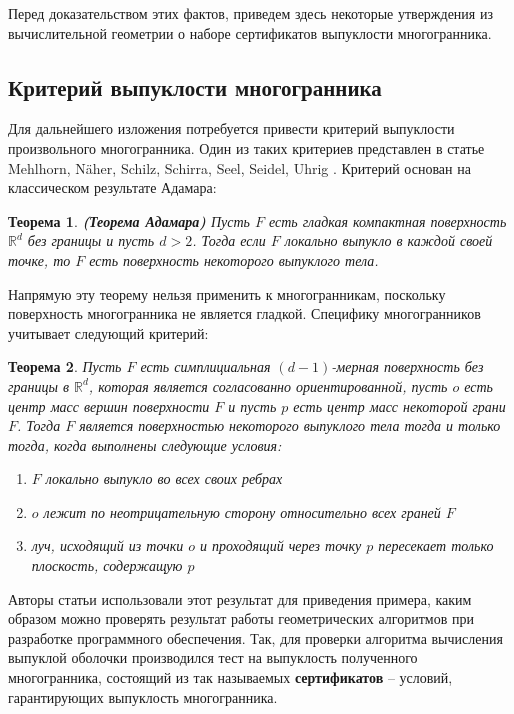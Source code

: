 \documentclass[a4paper, 12pt, titlepage]{article}
\theoremstyle{definition}
\theoremstyle{plain}
\newtheorem{SmartTheorem}{Теорема}
\theoremstyle{plain}
\begin{document}
Перед доказательством этих фактов, приведем здесь некоторые утверждения из
вычислительной геометрии о наборе сертификатов выпуклости многогранника.

\newpage
\subsection{Критерий выпуклости многогранника}
\label{sec:effictive-criterion:convexity-criterion}

Для дальнейшего изложения потребуется привести критерий выпуклости
произвольного многогранника. Один из таких критериев представлен в статье
Mehlhorn, Näher, Schilz, Schirra, Seel, Seidel, Uhrig
\cite{conf/compgeom/MehlhornNSSSSU96}. Критерий основан на классическом
результате Адамара:

\begin{SmartTheorem}
\textbf{(Теорема Адамара)} Пусть $\mathit{F}$ есть гладкая компактная
поверхность $\mathbb{R}^{d}$ без границы и пусть $d > 2$. Тогда если
$\mathit{F}$ локально выпукло  в каждой своей точке, то $\mathit{F}$ есть
поверхность некоторого выпуклого тела.
\end{SmartTheorem}

Напрямую эту теорему нельзя применить к многогранникам, поскольку поверхность
многогранника не является гладкой. Специфику многогранников учитывает
следующий критерий:

\begin{SmartTheorem}
Пусть $\mathit{F}$ есть симплициальная $(d - 1)$-мерная поверхность без
границы в $\mathbb{R}^{d}$, которая является согласованно ориентированной,
пусть $o$ есть центр масс вершин поверхности $\mathit{F}$ и пусть $p$ есть
центр масс некоторой грани $\mathit{F}$. Тогда $\mathit{F}$ является
поверхностью некоторого выпуклого тела тогда и только тогда, когда выполнены
следующие условия:
\begin{enumerate}
  \item $\mathit{F}$ локально выпукло во всех своих ребрах
  \item $o$ лежит по неотрицательную сторону относительно всех граней
  $\mathit{F}$
  \item луч, исходящий из точки $o$ и проходящий через точку $p$ пересекает
  только плоскость, содержащую $p$
\end{enumerate}
\end{SmartTheorem}

Авторы статьи \cite{conf/compgeom/MehlhornNSSSSU96} использовали этот
результат для приведения примера, каким образом можно проверять
результат работы геометрических алгоритмов при разработке программного
обеспечения. Так, для проверки алгоритма вычисления выпуклой оболочки
производился тест на выпуклость полученного многогранника, состоящий из так
называемых \textbf{сертификатов} -- условий, гарантирующих выпуклость
многогранника.
\end{document}
